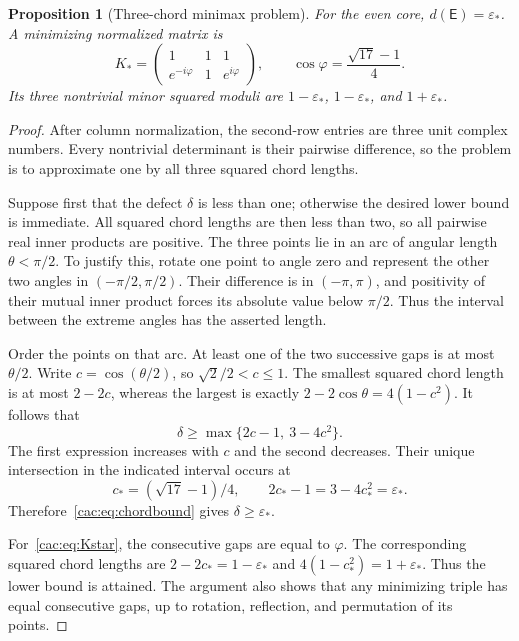 \documentclass[11pt]{article}
\numberwithin{equation}{section}
\newtheorem{proposition}[theorem]{Proposition}
\theoremstyle{definition}
\newcommand{\epsstar}{\varepsilon_*}
\newcommand{\Ecore}{\mathsf E}\newcommand{\Dcore}{\mathsf D}\newcommand{\Tcore}{\mathsf T}
\begin{document}
\begin{proposition}[Three-chord minimax problem]
\label{cac:prop:Esharp}
For the even core, $d(\Ecore)=\epsstar$. A minimizing normalized matrix is
\begin{equation}
 K_*=
 \begin{pmatrix}1&1&1\\ e^{-i\varphi}&1&e^{i\varphi}\end{pmatrix},
 \qquad
 \cos\varphi=\frac{\sqrt{17}-1}{4}.
 \label{cac:eq:Kstar}
\end{equation}
Its three nontrivial minor squared moduli are $1-\epsstar$, $1-\epsstar$, and $1+\epsstar$.
\end{proposition}
\begin{proof}
After column normalization, the second-row entries are three unit complex numbers. Every nontrivial determinant is their pairwise difference, so the problem is to approximate one by all three squared chord lengths.

Suppose first that the defect $\delta$ is less than one; otherwise the desired lower bound is immediate. All squared chord lengths are then less than two, so all pairwise real inner products are positive. The three points lie in an arc of angular length $\theta<\pi/2$. To justify this, rotate one point to angle zero and represent the other two angles in $(-\pi/2,\pi/2)$. Their difference is in $(-\pi,\pi)$, and positivity of their mutual inner product forces its absolute value below $\pi/2$. Thus the interval between the extreme angles has the asserted length.

Order the points on that arc. At least one of the two successive gaps is at most $\theta/2$. Write $c=\cos(\theta/2)$, so $\sqrt2/2<c\le1$. The smallest squared chord length is at most $2-2c$, whereas the largest is exactly $2-2\cos\theta=4(1-c^2)$. It follows that
\begin{equation}
 \delta\ge\max\{2c-1,\ 3-4c^2\}.
 \label{cac:eq:chordbound}
\end{equation}
The first expression increases with $c$ and the second decreases. Their unique intersection in the indicated interval occurs at
\[
 c_*=(\sqrt{17}-1)/4,
 \qquad 2c_*-1=3-4c_*^2=\epsstar.
\]
Therefore~\eqref{cac:eq:chordbound} gives $\delta\ge\epsstar$.

For~\eqref{cac:eq:Kstar}, the consecutive gaps are equal to $\varphi$. The corresponding squared chord lengths are $2-2c_*=1-\epsstar$ and $4(1-c_*^2)=1+\epsstar$. Thus the lower bound is attained. The argument also shows that any minimizing triple has equal consecutive gaps, up to rotation, reflection, and permutation of its points.
\end{proof}
\end{document}
